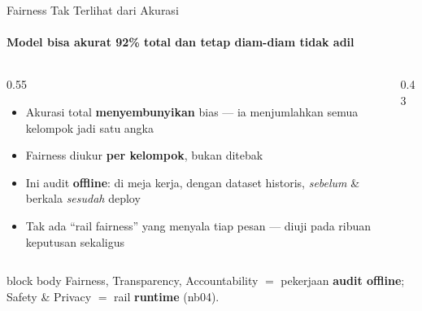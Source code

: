 \documentclass[aspectratio=169,t]{beamer}
\newcommand{\takeaway}[1]{%
  \vspace{0.3em}
  \begin{beamercolorbox}[rounded=true,shadow=false,sep=6pt]{block body}
    \centering\small\color{nvlightgreen}#1
  \end{beamercolorbox}%
}
\begin{document}
\begin{frame}{Fairness Tak Terlihat dari Akurasi}
  \framesubtitle{Model bisa akurat 92\% total dan tetap diam-diam tidak adil}
  \begin{columns}[T]
    \begin{column}{0.55\textwidth}
      \begin{itemize}\footnotesize
        \item Akurasi total \textbf{menyembunyikan} bias --- ia menjumlahkan semua kelompok jadi satu angka
        \item Fairness diukur \textbf{per kelompok}, bukan ditebak
        \item Ini audit \textbf{offline}: di meja kerja, dengan dataset historis, \emph{sebelum} \& berkala \emph{sesudah} deploy
        \item Tak ada ``rail fairness'' yang menyala tiap pesan --- diuji pada ribuan keputusan sekaligus
      \end{itemize}
    \end{column}
    \begin{column}{0.43\textwidth}
      \begin{center}
      \end{center}
    \end{column}
  \end{columns}
  \takeaway{Fairness, Transparency, Accountability $=$ pekerjaan \textbf{audit offline}; Safety \& Privacy $=$ rail \textbf{runtime} (nb04).}
\end{frame}
\end{document}
